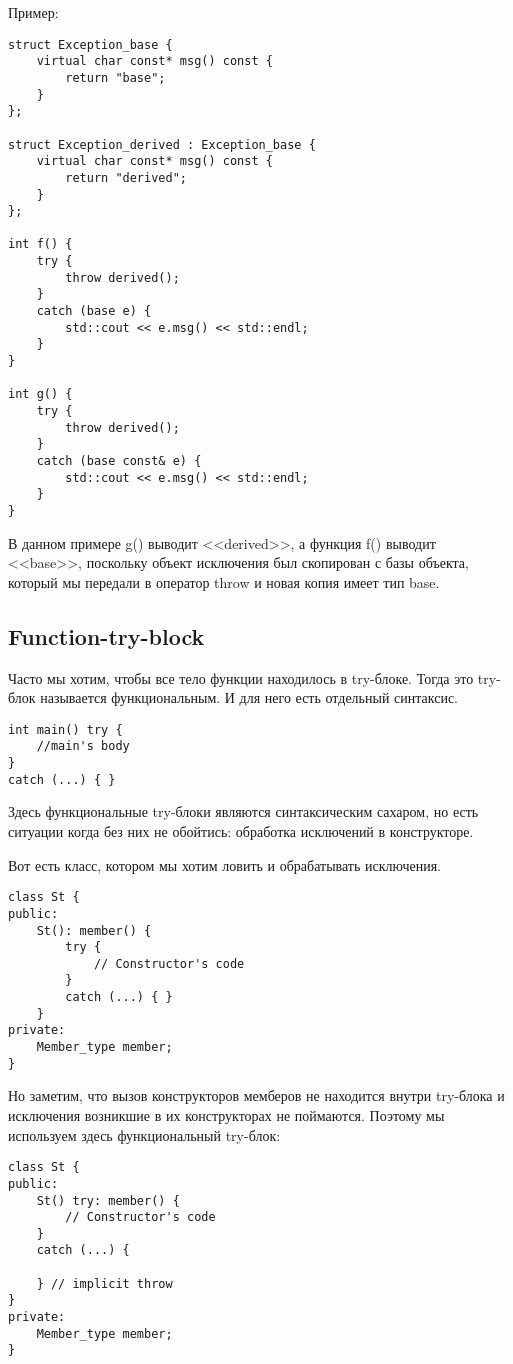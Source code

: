 Пример:
\begin{verbatim}
struct Exception_base {
    virtual char const* msg() const {
        return "base";
    }
};

struct Exception_derived : Exception_base {
    virtual char const* msg() const {
        return "derived";
    }
};

int f() {
    try {
        throw derived();
    }
    catch (base e) {
        std::cout << e.msg() << std::endl;
    }
}

int g() {
    try {
        throw derived();
    }
    catch (base const& e) {
        std::cout << e.msg() << std::endl;
    }
}
\end{verbatim}

В данном примере g() выводит <<derived>>, а функция f() выводит <<base>>, поскольку объект исключения был скопирован с базы объекта, который мы передали в оператор throw и новая копия имеет тип base.

\subsection{Function-try-block}

Часто мы хотим, чтобы все тело функции находилось в try-блоке. Тогда это try-блок называется функциональным. И для него есть отдельный синтаксис.
\begin{verbatim}
int main() try {
    //main's body
}
catch (...) { }
\end{verbatim}

Здесь функциональные try-блоки являются синтаксическим сахаром, но есть ситуации когда без них не обойтись: обработка исключений в конструкторе.

Вот есть класс, котором мы хотим ловить и обрабатывать исключения.
\begin{verbatim}
class St {
public:
    St(): member() {
        try {
            // Constructor's code
        }
        catch (...) { }
    }
private:
    Member_type member;
}
\end{verbatim}

Но заметим, что вызов конструкторов мемберов не находится внутри try-блока и исключения возникшие в их конструкторах не поймаются.
Поэтому мы используем здесь функциональный try-блок:

\begin{verbatim}
class St {
public:
    St() try: member() {
        // Constructor's code
    }
    catch (...) {

    } // implicit throw
}
private:
    Member_type member;
}
\end{verbatim}

